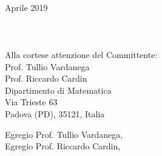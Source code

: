 \documentclass[11pt, a4paper]{letter} %
\begin{document}
	
	
	\begin{letter}{
			\-\\ Aprile 2019	
			\-\\\-\\\-\\\-\\
			Alla cortese attenzione del Committente:	\\
			Prof. Tullio Vardanega\\
			Prof. Riccardo Cardin\\	
			Dipartimento di Matematica\\ 
			Via Trieste 63\\ 
			Padova (PD), 35121, Italia
		}
		
		
		\opening{Egregio Prof.  Tullio Vardanega,\\
			Egregio Prof.  Riccardo Cardin,\\}
		

\end{letter}
\end{document}
